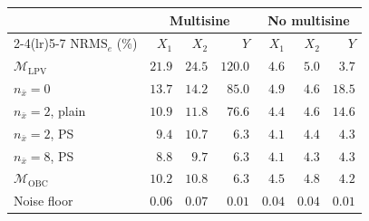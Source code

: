 \setlength{\tabcolsep}{3pt}
\begin{tabular}{l r r r r r r }
\toprule
 & \multicolumn{3}{c}{Multisine} & \multicolumn{3}{c}{No multisine}\\
\cmidrule(lr){2-4}\cmidrule(lr){5-7}
$\mathrm{NRMS}_e$ (\%) & $X_1$ & $X_2$ & $Y$ & $X_1$ & $X_2$ & $Y$\\
\midrule
$\mathcal{M}_{\mathrm{LPV}}$ & $21.9$ & $24.5$ & $120.0$ & $4.6$ & $5.0$ & $3.7$\\
$n_{\bar x}=0$ & $13.7$ & $14.2$ & $85.0$ & $4.9$ & $4.6$ & $18.5$\\
$n_{\bar x}=2$, plain & $10.9$ & $11.8$ & $76.6$ & $4.4$ & $4.6$ & $14.6$\\
$n_{\bar x}=2$, PS & $9.4$ & $10.7$ & $6.3$ & $4.1$ & $4.4$ & $4.3$\\
$n_{\bar x}=8$, PS & $8.8$ & $9.7$ & $6.3$ & $4.1$ & $4.3$ & $4.3$\\
\midrule
$\mathcal{M}_{\mathrm{OBC}}$ & $10.2$ & $10.8$ & $6.3$ & $4.5$ & $4.8$ & $4.2$\\
\midrule
Noise floor & $0.06$ & $0.07$ & $0.01$ & $0.04$ & $0.04$ & $0.01$\\
\bottomrule
\end{tabular}
